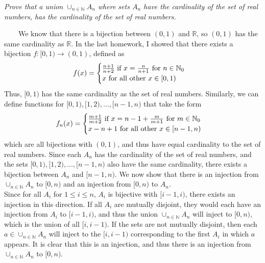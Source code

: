 \documentclass[
]{article}
\begin{document}
\emph{Prove that a union \(\cup _{n \in \mathbb{N}} A_n\) where sets
\(A_n\) have the cardinality of the set of real numbers, has the
cardinality of the set of real numbers.}

~~~~We know that there is a bijection between \((0, 1)\) and
\(\mathbb{R}\), so \((0, 1)\) has the same cardinality as
\(\mathbb{R}\). In the last homework, I showed that there exists a
bijection \(f: [0, 1) \to (0, 1)\), defined as
\[f(x) = \begin{cases} \frac{n+1}{n+2} \space \space \text{  if } x = \frac{n}{n+1} \text{ for } n \in \mathbb{N}_0 \\ x \space \space\text{ for all other } x \in [0,1) \end{cases}\]
Thus, \([0, 1)\) has the same cardinality as the set of real numbers.
Similarly, we can define functions for \([0,1), [1, 2), ..., [n-1, n)\)
that take the form
\[f_n(x) = \begin{cases} \frac{m+1}{m+2} \space \space \text{  if } x = n - 1 +\frac{m}{m+1} \text{ for } m \in \mathbb{N}_0 \\ x - n + 1 \space \space\text{ for all other } x \in [n -1,n) \end{cases}\]
which are all bijections with \((0,1)\), and thus have equal cardinality
to the set of real numbers. Since each \(A_n\) has the cardinality of
the set of real numbers, and the sets \([0,1), [1, 2), ...,[n-1, n)\)
also have the same cardinality, there exists a bijection between \(A_n\)
and \([n-1, n)\). We now show that there is an injection from
\(\cup _{n \in \mathbb{N}}A_n\) to \([0, n)\) and an injection from
\([0, n)\) to \(A_n\).\\
\hspace*{0.333em}\hspace*{0.333em}\hspace*{0.333em}\hspace*{0.333em}Since
for all \(A_i\) for \(1 \leq i \leq n\), \(A_i\) is bijective with
\([i - 1, i)\), there exists an injection in this direction. If all
\(A_i\) are mutually disjoint, they would each have an injection from
\(A_i\) to \([i - 1, i)\), and thus the union
\(\cup _{n \in \mathbb{N}}A_n\) will inject to \([0, n)\), which is the
union of all \([i, i-1)\). If the sets are not mutually disjoint, then
each \(a \in \cup _{n \in \mathbb{N}}A_n\) will inject to the
\([i, i-1)\) corresponding to the first \(A_i\) in which \(a\) appears.
It is clear that this is an injection, and thus there is an injection
from \(\cup _{n \in \mathbb{N}}A_n\) to \([0, n)\).\\
\end{document}
